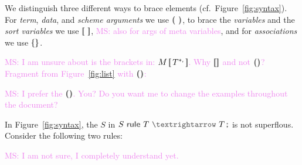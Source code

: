 \documentclass[letterpaper,11pt]{article}
\newcommand{\MS}[1]{\textcolor{violet}{MS: #1}}
\begin{document}
We distinguish three different ways to brace elements (cf.\ Figure~\ref{fig:syntax}). For
\emph{term}, \emph{data}, and \emph{scheme arguments} we use $\kw{( )}$, to brace the
\emph{variables} and the \emph{sort variables} we use $\kw{[ ]}$, \MS{also for args of meta
  variables}, and for \emph{associations} we use $\kwm\{ \kwm\}$.


\MS{I am unsure about is the brackets in: $M\,\kw[\,T^{*\kw,}\,\kw]$. Why $\kw[\kw]$ and not
  $\kw(\kw)$? Fragment from Figure~\ref{fig:list} with  $\kw(\kw)$:}
\MS{I prefer the $\kw(\kw)$. You? Do you want me to change the examples throughout the document?}

In Figure~\ref{fig:syntax}, the $S$ in $S~\kw{rule}~T~\kw{$→$}~T\,\kw;$ is not superflous. Consider
the following two rules:
\MS{I am not sure, I completely understand yet.}
\end{document}
